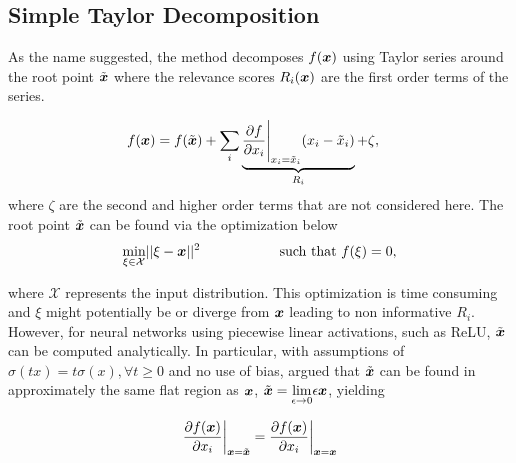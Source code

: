 %




\subsection{Simple Taylor Decomposition}
As the name suggested,  the method decomposes $f(\patvector{x})$ using Taylor series around the root point $\tilde{\boldsymbol{x}}$ where the relevance scores $R_i(\boldsymbol{x})$ are the first order terms of the series.


\begin{align} \label{eq:simple_taylor_expansion}
	f(\patvector{x}) 	&= f(\tilde{\patvector{x}}) + \sum_{i} \underbrace{\frac{\partial f }{ \partial x_i } \Bigg|_{x_i = \tilde{x}_i}  ( x_i - \tilde{x}_i ) }_{R_i} + \zeta, 
\end{align}
where $\zeta$ are the second and higher order terms that are not considered here. The root point $\tilde{\boldsymbol{x}}$ can be found via the optimization below 
\begin{align}
\underset{\xi \in \mathcal{X} }{\text{min}}  || \xi - \patvector{x} ||^2 \hspace{2cm}  \text{such that}\  f(\xi) = 0,
\end{align}

where $\mathcal{X}$ represents the input distribution. This optimization is time consuming  and $\xi$ might potentially be  or diverge from $\patvector{x}$ leading to non informative $R_i$. However, for neural networks using piecewise linear activations, such as ReLU,  $\tilde{\boldsymbol{x}}$ can be computed analytically. In particular, with assumptions of $\sigma(tx) = t\sigma(x) ,\forall t \ge 0$ and no use of bias, \cite{MontavonMethodsInterpretingUnderstanding2017} argued that $\tilde{\patvector{x}}$ can be found in  approximately the same flat region as $\patvector{x}$, $\tilde{\patvector{x}} = \underset{\epsilon \rightarrow 0 }{\lim} \epsilon \patvector{x}$, yielding

\begin{align}
	\frac{\partial f(\patvector{x})}{\partial x_i}\bigg|_{\patvector{x}={\tilde{\patvector{x}}}} = \frac{\partial f(\patvector{x})}{\partial x_i}\bigg|_{\patvector{x}={\patvector{x}}} 
\end{align}

